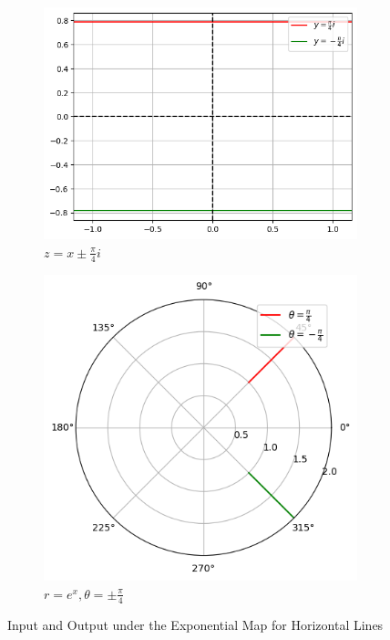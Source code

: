 \begin{figure}[htbp]
    \centering
    \begin{subfigure}[b]{0.45\textwidth}
        \centering
        \includegraphics[width=\linewidth]{FIG_MAT215/exp z horizontal lines.png}
        \caption{$z = x \pm \frac{\pi}{4}i$}
        \label{fig:exp_inputs_h}
    \end{subfigure}
    \hfill
    \begin{subfigure}[b]{0.45\textwidth}
        \centering
        \includegraphics[width=\linewidth]{FIG_MAT215/exp z horizontal lines out.png}
        \caption{$r=e^x,\theta =\pm\frac{\pi}{4}$}
        \label{fig:exp_outputs_h}
    \end{subfigure}
    \caption{Input and Output under the Exponential Map for Horizontal Lines}
    \label{fig:exp_map_horizontal_lines}
\end{figure}
